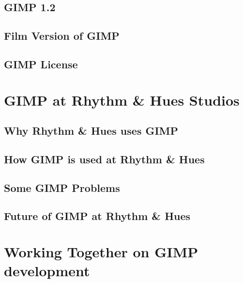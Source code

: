 \documentclass{report}
\begin{document}
\section{GIMP 1.2}

\section{Film Version of GIMP} 

\section{GIMP License}


\chapter{GIMP at Rhythm \& Hues Studios}

\section{Why Rhythm \& Hues uses GIMP}

\section{How GIMP is used at Rhythm \& Hues}

\section{Some GIMP Problems}

\section{Future of GIMP at Rhythm \& Hues} 


\chapter{Working Together on GIMP development}

\end{document}
